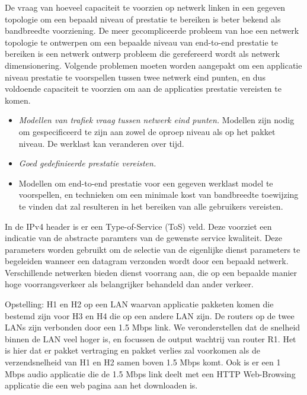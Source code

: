 \noindent De vraag van hoeveel capaciteit te voorzien op netwerk linken in een gegeven topologie om een bepaald niveau of prestatie te bereiken is beter bekend als bandbreedte voorziening. De meer gecompliceerde probleem van hoe een netwerk topologie te ontwerpen om een bepaalde niveau van end-to-end prestatie te bereiken is een netwerk ontwerp probleem die gerefereerd wordt als netwerk dimensionering. Volgende problemen moeten worden aangepakt om een applicatie niveau prestatie te voorspellen tussen twee netwerk eind punten, en dus voldoende capaciteit te voorzien om aan de applicaties prestatie vereisten te komen.
\begin{itemize}

\item	\textit{Modellen van trafiek vraag tussen netwerk eind punten.} Modellen zijn nodig om gespecificeerd te zijn aan zowel de oproep niveau als op het pakket niveau.  De werklast kan veranderen over tijd.
\item	\textit{Goed gedefinieerde prestatie vereisten.}
\item	Modellen om end-to-end prestatie voor een gegeven werklast model te voorspellen, en technieken om een minimale kost van bandbreedte toewijzing te vinden dat zal resulteren in het bereiken van alle gebruikers vereisten.
\end{itemize}

\newpage


\noindent In de IPv4 header is er een Type-of-Service (ToS) veld. Deze voorziet een indicatie van de abstracte paramters van de gewenste service kwaliteit. Deze parameters worden gebruikt om de selectie van de eigenlijke dienst parameters te begeleiden wanneer een datagram verzonden wordt door een bepaald netwerk. Verschillende netwerken bieden dienst voorrang aan, die op een bepaalde manier hoge voorrangsverkeer als belangrijker behandeld dan ander verkeer.




\noindent Opstelling: H1 en H2 op een LAN waarvan applicatie pakketen komen die bestemd zijn voor H3 en H4 die op een andere LAN zijn. De routers op de twee LANs zijn verbonden door een 1.5 Mbps link. We veronderstellen dat de snelheid binnen de LAN veel hoger is, en focussen de output wachtrij van router R1. Het is hier dat er pakket vertraging en pakket verlies zal voorkomen als de verzendsnelheid van H1 en H2 samen boven 1.5 Mbps komt. Ook is er een 1 Mbps audio applicatie die de 1.5 Mbps link deelt met een HTTP Web-Browsing applicatie die een web pagina aan het downloaden is.

